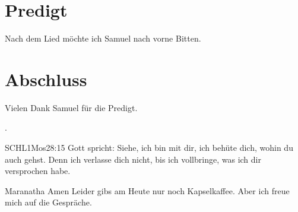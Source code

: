 \documentclass{mybib}
\begin{document}
\section{Predigt}
Nach dem Lied möchte ich Samuel nach vorne Bitten.





\section{Abschluss}
Vielen Dank Samuel für die Predigt.

.

\beten{}

\begin{bibelbox}{SCHL}{1Mos}{28:15}
    Gott spricht: Siehe, ich bin mit dir,
    ich behüte dich, wohin du auch gehst.
    Denn ich verlasse dich nicht,
    bis ich vollbringe, was ich dir versprochen habe.
\end{bibelbox}

Maranatha Amen
Leider gibs am Heute nur noch Kapselkaffee. Aber ich freue mich auf die Gespräche.
\end{document}
